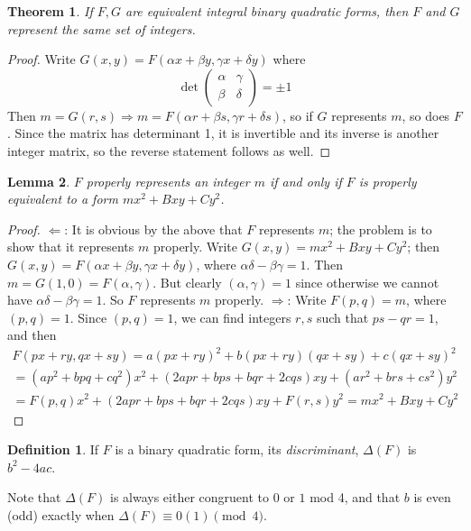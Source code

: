 \documentclass[12pt]{article}
\newtheorem{thm}{Theorem}
\newtheorem{lem}[thm]{Lemma}
\theoremstyle{definition}
\newtheorem{defn}{Definition}
\begin{document}
\begin{thm} If $F, G$ are equivalent integral binary quadratic forms, then $F$ and $G$ represent the same set of integers.
\end{thm}
\begin{proof}
Write $G(x,y)=F(\alpha x+\beta y, \gamma x+\delta y)$ where
\[
\det\left( \begin{array}{cc}
\alpha & \gamma \\
\beta & \delta
\end{array}\right) = \pm 1
\]
Then $m=G(r,s) \Rightarrow m=F(\alpha r+\beta s,\gamma r+\delta s)$, so if $G$ represents $m$, so does $F$. Since the matrix has determinant 1, it is invertible and its inverse is another integer matrix, so the reverse statement follows as well.
\end{proof}

\begin{lem} $F$ properly represents an integer $m$ if and only if $F$ is properly equivalent to a form $mx^2+Bxy+Cy^2$.
\end{lem}
\begin{proof}
$\Leftarrow$: It is obvious by the above that $F$ represents $m$; the problem is to show that it represents $m$ properly. Write $G(x,y)=mx^2+Bxy+Cy^2$; then $G(x,y)=F(\alpha x+\beta y,\gamma x+\delta y)$, where $\alpha\delta-\beta\gamma=1$. Then $m=G(1,0)=F(\alpha,\gamma)$. But clearly $(\alpha,\gamma)=1$ since otherwise we cannot have $\alpha\delta-\beta\gamma=1$. So $F$ represents $m$ properly.
\newline
$\Rightarrow$: Write $F(p,q)=m$, where $(p,q)=1$. Since $(p,q)=1$, we can find integers $r,s$ such that $ps-qr=1$, and then
\begin{multline*}
F(px+ry,qx+sy)=a(px+ry)^2+b(px+ry)(qx+sy)+c(qx+sy)^2\\
=(ap^2+bpq+cq^2)x^2+(2apr+bps+bqr+2cqs)xy+(ar^2+brs+cs^2)y^2 \\
=F(p,q)x^2+(2apr+bps+bqr+2cqs)xy+F(r,s)y^2=mx^2+Bxy+Cy^2
\end{multline*}
\end{proof}

\begin{defn} If $F$ is a binary quadratic form, its \emph{discriminant}, $\Delta(F)$ is $b^2-4ac$.
\end{defn}

Note that $\Delta(F)$ is always either congruent to $0$ or $1$ mod 4, and that $b$ is even (odd) exactly when $\Delta(F)\equiv 0 (1) \pmod 4$.
\end{document}
